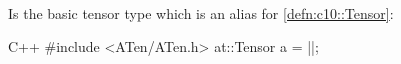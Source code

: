 \begin{defnbox}\nospacing
    \begin{defn}\label{defn:at::tensors}\leavevmode\\
        Is the basic tensor type which is an alias for \cref{defn:c10::Tensor}:
        \begin{mintlinebox}{C++}
            #include <ATen/ATen.h>
            at::Tensor a = |\texttt{}|;
        \end{mintlinebox}
    \end{defn}
\end{defnbox}

